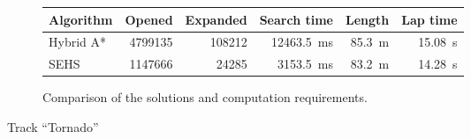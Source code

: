 \begin{figure}[!tbp]
	\vspace{0.75cm}
	
	\begin{subfigure}[t]{\textwidth}
		\centering
		\begin{tabular}{l r r r r r}%
			\toprule
			Algorithm & Opened & Expanded & Search time & Length & Lap time \\
			\midrule
			Hybrid A* & \num{4799135} & \num{108212} & \SI{12463.5}{\milli\second} & \SI{85.3}{\meter} & \SI{15.08}{\second} \\
			SEHS & \bftab \num{1147666} & \bftab \num{24285} & \bftab \SI{3153.5}{\milli\second} & \SI{83.2}{\meter} & \bftab \SI{14.28}{\second} \\
			\bottomrule
		\end{tabular}
		\caption{Comparison of the solutions and computation requirements.}
		\label{table:tornado}
	\end{subfigure}
	
	\vspace{0.75cm}
	
	\caption{Track ``Tornado''}
	\label{fig:tornado}
\end{figure}


